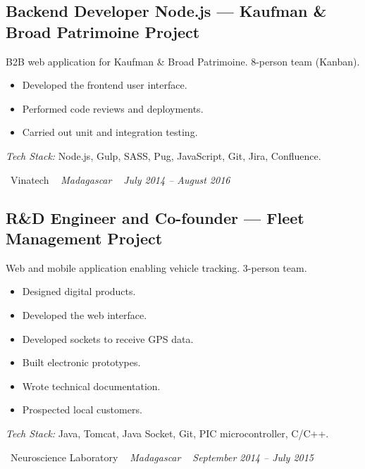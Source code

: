 \documentclass[10pt,a4paper]{article}
\begin{document}
\vspace{6pt}

\subsection*{Backend Developer Node.js --- Kaufman \& Broad Patrimoine Project}
\color{darkgray}
B2B web application for Kaufman \& Broad Patrimoine. 8-person team (Kanban).
\begin{itemize}
  \item Developed the frontend user interface.
  \item Performed code reviews and deployments.
  \item Carried out unit and integration testing.
\end{itemize}
\textit{Tech Stack:} Node.js, Gulp, SASS, Pug, JavaScript, Git, Jira, Confluence.

\vspace{10pt}

\noindent\textcolor{primary}{ \faBuilding\ Vinatech} \quad
\textit{ \small \textcolor{darkgray}{ \faMapMarker\ } Madagascar } \hfill
\textit{ \small \textcolor{darkgray}{ \faCalendar\ } July 2014 -- August 2016 }

\vspace{4pt}

\subsection*{R\&D Engineer and Co-founder --- Fleet Management Project}
\color{darkgray}
Web and mobile application enabling vehicle tracking. 3-person team.
\begin{itemize}
  \item Designed digital products.
  \item Developed the web interface.
  \item Developed sockets to receive GPS data.
  \item Built electronic prototypes.
  \item Wrote technical documentation.
  \item Prospected local customers.
\end{itemize}
\textit{Tech Stack:} Java, Tomcat, Java Socket, Git, PIC microcontroller, C/C++.

\vspace{10pt}

\noindent\textcolor{primary}{ \faBuilding\ Neuroscience Laboratory} \quad
\textit{ \small \textcolor{darkgray}{ \faMapMarker\ } Madagascar } \hfill
\textit{ \small \textcolor{darkgray}{ \faCalendar\ } September 2014 -- July 2015 }
\end{document}
